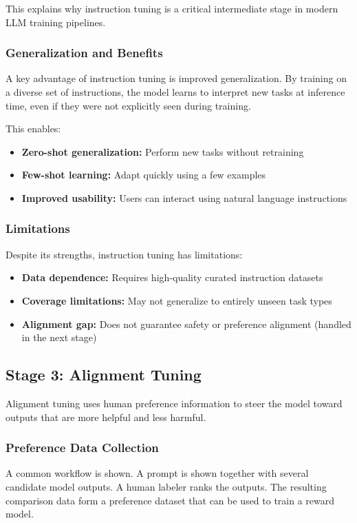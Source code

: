 \documentclass{article}
\begin{document}
This explains why instruction tuning is a critical intermediate stage in modern LLM training pipelines.

\subsubsection{Generalization and Benefits}

A key advantage of instruction tuning is improved generalization. By training on a diverse set of instructions, the model learns to interpret new tasks at inference time, even if they were not explicitly seen during training.

This enables:
\begin{itemize}
    \item \textbf{Zero-shot generalization:} Perform new tasks without retraining
    \item \textbf{Few-shot learning:} Adapt quickly using a few examples
    \item \textbf{Improved usability:} Users can interact using natural language instructions
\end{itemize}

\subsubsection{Limitations}

Despite its strengths, instruction tuning has limitations:
\begin{itemize}
    \item \textbf{Data dependence:} Requires high-quality curated instruction datasets
    \item \textbf{Coverage limitations:} May not generalize to entirely unseen task types
    \item \textbf{Alignment gap:} Does not guarantee safety or preference alignment (handled in the next stage)
\end{itemize}

\subsection{Stage 3: Alignment Tuning}
Alignment tuning uses human preference information to steer the model toward outputs that are more helpful and less harmful.

\subsubsection{Preference Data Collection}
A common workflow is shown. A prompt is shown together with several candidate model outputs. A human labeler ranks the outputs. The resulting comparison data form a preference dataset that can be used to train a reward model.
\end{document}
